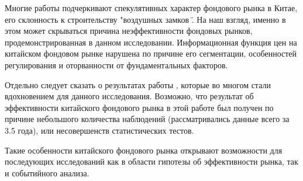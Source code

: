 \documentclass[a4paper,12pt]{article}
\begin{document}
Многие работы подчеркивают спекулятивных характер фондового рынка в Китае, его склонность к строительству "воздушных замков \". На наш взгляд, именно в этом может скрываться причина неэффективности фондовых рынков, продемонстрированная в данном исследовании. Информационная функция цен на китайском фондовом рынке нарушена по причине его сегментации, особенностей регулирования и оторванности от фундаментальных факторов.

Отдельно следует сказать о результатах работы \cite{Liu1997}, которые во многом стали вдохновением для данного исследования. Возможно, что результат об эффективности китайского фондового рынка в этой работе был получен по причине небольшого количества наблюдений (рассматривались данные всего за 3.5 года), или несовершенств статистических тестов.

Такие особенности китайского фондового рынка открывают возможности для последующих исследований как в области гипотезы об эффективности рынка, так и событийного анализа.
\newpage


\thispagestyle{empty}
\end{document}
